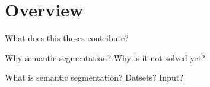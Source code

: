 \section{Overview}
What does this theses contribute?

Why semantic segmentation?
Why is it not solved yet?

What is semantic segmentation?
Datsets? Input?
